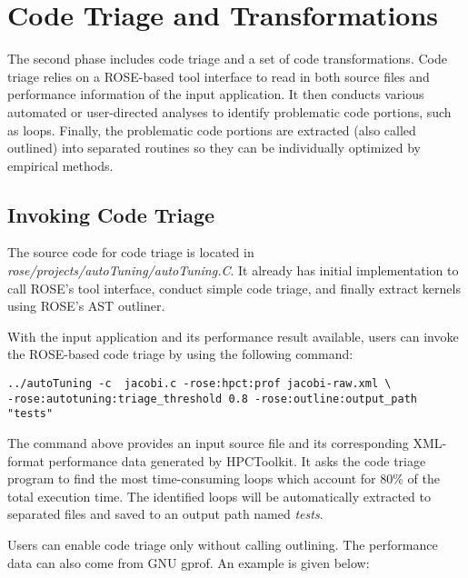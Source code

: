 \section{Code Triage and Transformations}
The second phase includes code triage and a set of code transformations. 
Code triage relies on a ROSE-based tool interface to read in both source files and performance information of
the input application.
It then conducts various automated or user-directed analyses to identify problematic code portions, such as loops. 
Finally, the problematic code portions are extracted (also called outlined) into separated routines so they can be individually
optimized by empirical methods. 


\subsection{Invoking Code Triage}
The source code for code triage is located in
\textit{rose/projects/autoTuning/autoTuning.C}. 
It already has initial implementation to call ROSE's tool interface,
conduct simple code triage, and finally extract kernels using ROSE's AST
outliner. 

With the input application and its performance result available, users can
invoke the ROSE-based code triage by using the following command:

{\mySmallFontSize
\begin{verbatim}
../autoTuning -c  jacobi.c -rose:hpct:prof jacobi-raw.xml \
-rose:autotuning:triage_threshold 0.8 -rose:outline:output_path "tests"
\end{verbatim}
}

The command above provides an input source file and its corresponding XML-format performance data generated by HPCToolkit.
It asks the code triage program to find the most time-consuming 
loops which account for 80\% of the total execution time. 
The identified loops will be automatically extracted to separated files and saved to an output path named \textit{tests}.

Users can enable code triage only without calling outlining. 
The performance data can also come from GNU gprof. 
An example is given below:

